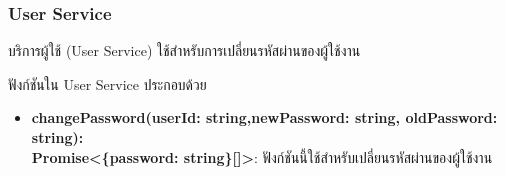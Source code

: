 \subsubsection{User Service}
\ifenglish
\else
บริการผู้ใช้ (User Service) ใช้สำหรับการเปลี่ยนรหัสผ่านของผู้ใช้งาน

ฟังก์ชันใน User Service ประกอบด้วย
\begin{itemize}
    \item \textbf{changePassword(userId: string,newPassword: string, oldPassword: string): \\ Promise<\{password: string\}[]>}: ฟังก์ชันนี้ใช้สำหรับเปลี่ยนรหัสผ่านของผู้ใช้งาน
\end{itemize}
\fi

\clearpage